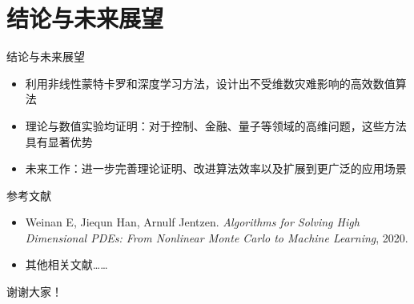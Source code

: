 \documentclass[aspectratio=169]{beamer}
\begin{document}
	\section{结论与未来展望}
	\begin{frame}{结论与未来展望}
		\begin{itemize}
			\item 利用非线性蒙特卡罗和深度学习方法，设计出不受维数灾难影响的高效数值算法
			\item 理论与数值实验均证明：对于控制、金融、量子等领域的高维问题，这些方法具有显著优势
			\item 未来工作：进一步完善理论证明、改进算法效率以及扩展到更广泛的应用场景
		\end{itemize}
	\end{frame}

	\begin{frame}{参考文献}
		\begin{itemize}
			\item Weinan E, Jiequn Han, Arnulf Jentzen. \emph{Algorithms for Solving High Dimensional PDEs: From Nonlinear Monte Carlo to Machine Learning}, 2020.
			\item 其他相关文献……
		\end{itemize}
	\end{frame}

	\begin{frame}
		\centering \Large 谢谢大家！
	\end{frame}
\end{document}
